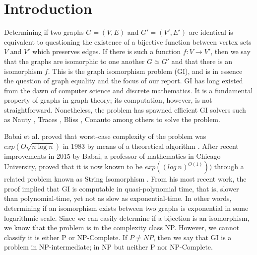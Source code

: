 
\chapter{Introduction}  %

\ifpdf
    \graphicspath{{Chapter1/Figs/Raster/}{Chapter1/Figs/PDF/}{Chapter1/Figs/}}
\else
    \graphicspath{{Chapter1/Figs/Vector/}{Chapter1/Figs/}}
\fi
Determining if two graphs $G=(V,E)$ and $G'=(V',E')$ are identical is equivalent to questioning the existence of a bijective function between vertex sets $V$ and $V'$ which preserves edges. If there is such a function $f:V \rightarrow V'$, then we say that the graphs are isomorphic to one another $G{\simeq}G'$ and that there is an isomorphism $f$. This is the graph isomorphism problem (GI), and is in essence the question of graph equality and the focus of our report.  GI has long existed from the dawn of computer science and discrete mathematics. It is a fundamental property of graphs in graph theory; its computation, however, is not straightforward. Nonetheless, the problem has spawned efficient GI solvers such as Nauty \cite{mckay1981practical}, Traces \cite{mckay2014practical}, Bliss \cite{junttila2007engineering}, Conauto \cite{lopez2011conauto} among others to solve the problem.
\par
Babai et al. proved that worst-case complexity of the problem was ${exp(O\sqrt{n\log n})}$ in 1983 by means of a theoretical algorithm \cite{babai1983computational}. After recent improvements in 2015 by Babai, a professor of mathematics in Chicago University, proved that it is now known to be ${exp((log \ n)^{O(1)}))}$ through a related problem known as String Isomorphism \cite{babai2016graph}. From his most recent work, the proof implied that GI is computable in quasi-polynomial time, that is, slower than polynomial-time, yet not as slow as exponential-time. In other words, determining if an isomorphism exists between two graphs is exponential in some logarithmic scale. Since we can easily determine if a bijection is an isomorphism, we know that the problem is in the complexity class NP. However, we cannot classify it is either P or NP-Complete. If $P\neq NP$, then we say that GI is a problem in NP-intermediate; in NP but neither P nor NP-Complete.
